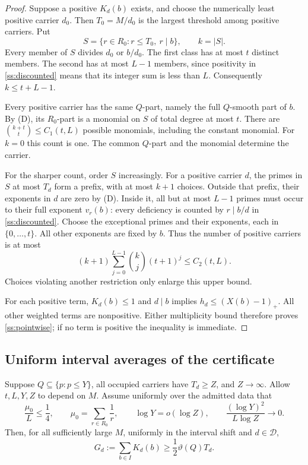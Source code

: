\begin{proof}
Suppose a positive $K_d(b)$ exists, and choose the numerically least
positive carrier $d_0$. Then $T_0=M/d_0$ is the largest threshold
among positive carriers. Put
\[
 S=\{r\in R_0:r\le T_0,\ r\mid b\},\qquad k=|S|.
\]
Every member of $S$ divides $d_0$ or $b/d_0$.
The first class has at most $t$ distinct members.
The second has at most $L-1$ members, since positivity in
\eqref{ss:discounted} means that its integer sum is less than $L$.
Consequently $k\le t+L-1$.

Every positive carrier has the same $Q$-part, namely the full $Q$-smooth
part of $b$. By (D), its $R_0$-part is a monomial on $S$ of total
degree at most $t$. There are $\binom{k+t}{t}\le C_1(t,L)$ possible
monomials, including the constant monomial. For $k=0$ this count is one.
The common $Q$-part and the monomial determine the carrier.

For the sharper count, order $S$ increasingly.
For a positive carrier $d$, the primes in $S$ at most $T_d$ form a
prefix, with at most $k+1$ choices. Outside that prefix, their exponents
in $d$ are zero by (D). Inside it, all but at most $L-1$ primes must
occur to their full exponent $v_r(b)$: every deficiency is counted
by $r\mid b/d$ in \eqref{ss:discounted}.
Choose the exceptional primes and their exponents, each in
$\{0,\ldots,t\}$. All other exponents are fixed by $b$. Thus the number
of positive carriers is at most
\[
 (k+1)\sum_{j=0}^{L-1}\binom{k}{j}(t+1)^j\le C_2(t,L).
 \]
Choices violating another restriction only enlarge this upper bound.

For each positive term, $K_d(b)\le1$ and $d\mid b$ implies
$h_d\le(X(b)-1)_+$. All other weighted terms are nonpositive.
Either multiplicity bound therefore proves \eqref{ss:pointwise};
if no term is positive the inequality is immediate.
\end{proof}

\subsection{Uniform interval averages of the certificate}

\begin{lemma}
\label{ss:average}
Suppose $Q\subseteq\{p:p\le Y\}$, all occupied carriers have $T_d\ge Z$,
and $Z\to\infty$. Allow $t,L,Y,Z$ to depend on $M$.
Assume uniformly over the admitted data that
\begin{equation}
 \frac{\mu_0}{L}\le\frac14,\qquad
 \mu_0=\sum_{r\in R_0}\frac1r,\qquad
 \log Y=o(\log Z),\qquad
 \frac{(\log Y)^2}{L\log Z}\longrightarrow0.
 \label{ss:average-conditions}
\end{equation}
Then, for all sufficiently large $M$, uniformly in the interval shift
and $d\in\mathcal D$,
\begin{equation}
 G_d:=\sum_{b\in I}K_d(b)
 \ge\frac12\vartheta(Q)T_d.
 \label{ss:positive-average}
\end{equation}
\end{lemma}

